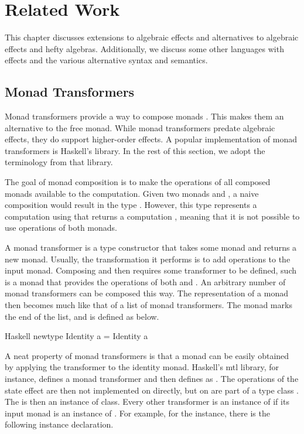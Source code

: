\chapter{Related Work}\label{chap:related_work}

This chapter discusses extensions to algebraic effects and alternatives to algebraic effects and hefty algebras. Additionally, we discuss some other languages with effects and the various alternative syntax and semantics.

\section{Monad Transformers}\label{sec:monad_transformers}

Monad transformers provide a way to compose monads \autocite{moggi_abstract_1989}. This makes them an alternative to the free monad. While monad transformers predate algebraic effects, they do support higher-order effects. A popular implementation of monad transformers is Haskell's  library. In the rest of this section, we adopt the terminology from that library.

The goal of monad composition is to make the operations of all composed monads available to the computation. Given two monads  and , a naive composition would result in the type . However, this type represents a computation using  that returns a computation , meaning that it is not possible to use operations of both monads.

A monad transformer is a type constructor that takes some monad and returns a new monad. Usually, the transformation it performs is to add operations to the input monad. Composing  and  then requires some transformer  to be defined, such  is a monad that provides the operations of both  and . An arbitrary number of monad transformers can be composed this way. The representation of a monad then becomes much like that of a list of monad transformers. The  monad marks the end of the list, and is defined as below.

\begin{lst}{Haskell}
newtype Identity a = Identity a
\end{lst}
%
A neat property of monad transformers is that a monad can be easily obtained by applying the transformer to the identity monad. Haskell's mtl library, for instance, defines a monad transformer  and then defines  as . The operations of the state effect are then not implemented on  directly, but on are part of a type class . The  is then an instance of  class. Every other transformer is an instance of  if its input monad is an instance of . For example, for the  instance, there is the following instance declaration.

